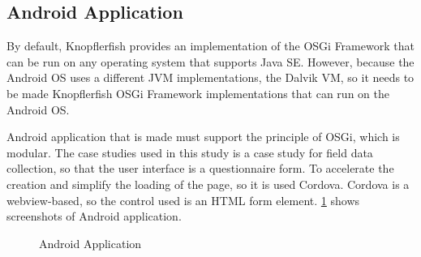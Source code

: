 \documentclass[conference]{IEEEtran}
\begin{document}
\subsection{Android Application} \label{ssec:android-application}
By default, Knopflerfish provides an implementation of the OSGi Framework that can be run on any operating system that supports Java SE. However, because the Android OS uses a different JVM implementations, the Dalvik VM, so it needs to be made Knopflerfish OSGi Framework implementations that can run on the Android OS.

Android application that is made must support the principle of OSGi, which is modular. The case studies used in this study is a case study for field data collection, so that the user interface is a questionnaire form. To accelerate the creation and simplify the loading of the page, so it is used Cordova. Cordova is a webview-based, so the control used is an HTML form element. \figurename{\ref{fig:android-app}} shows screenshots of Android application.

\begin{figure}
	\centering
	\hfil
	\hfil
	\caption{Android Application}
	\label{fig:android-app}
\end{figure}
\end{document}
